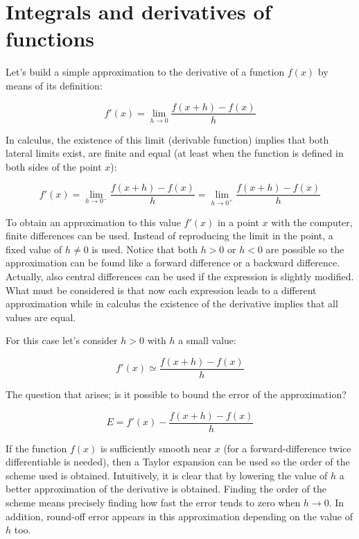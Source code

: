 \newpage 
\section{Integrals and derivatives of functions}   \label{sec:intder}

Let's build a simple approximation to the derivative of a function $ f(x) $ by means of its definition:

\begin{equation}
    f'(x) = \lim_{h\rightarrow 0}\frac{f(x+h)-f(x)}{h}
\end{equation}

In calculus, the existence of this limit (derivable function) implies that both lateral limits exist, are finite and equal (at least when the function is defined in both sides of the point $x$):

\begin{equation}
    f'(x) = \lim_{h\rightarrow 0^-}\frac{f(x+h)-f(x)}{h} = \lim_{h\rightarrow 0^+}\frac{f(x+h)-f(x)}{h}
\end{equation}

To obtain an approximation to this value $ f'(x) $ in a point $x $ with the computer, finite differences can be used. Instead of reproducing the limit in the point, a fixed value of $ h \neq 0$ is used. Notice that both $ h > 0 $ or $ h < 0 $ are possible so the approximation can be found like a forward difference or a backward difference. Actually, also central differences can be used if the expression is slightly modified. What must be considered is that now each expression leads to a different approximation while in calculus the existence of the derivative implies that all values are equal. 

For this case let's consider $ h > 0 $ with $h$ a small value:

\begin{equation}
    f'(x) \simeq \frac{f(x+h)-f(x)}{h}
\end{equation}

The question that arises; is it possible to bound the error of the approximation? 

\begin{equation}
    E = f'(x) - \frac{f(x+h)-f(x)}{h}
\end{equation}

If the function $f(x)$ is sufficiently smooth near $x$ (for a forward-difference twice differentiable is needed), then a Taylor expansion can be used so the order of the scheme used is obtained. Intuitively, it is clear that by lowering the value of $h$ a better approximation of the derivative is obtained. Finding the order of the scheme means precisely finding how fast the error tends to zero when $h\rightarrow 0$. In addition, round-off error appears in this approximation depending on the value of $h$ too.

